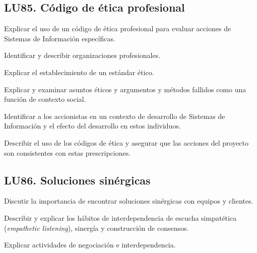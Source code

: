 \subsection{LU85. Código de ética profesional}\label{sec:BOK-LU85}\label{sec:LU85}
\begin{LearningUnit}
\begin{LUGoal}
\item Explicar el uso de un código de ética profesional para evaluar acciones de Sistemas de Información específicas.
\end{LUGoal}

\begin{LUObjective}
\item Identificar y describir organizaciones profesionales.
\item Explicar el establecimiento de un estándar ético.
\item Explicar y examinar asuntos éticos y argumentos y métodos fallidos como una función de contexto social.
\item Identificar a los accionistas en un contexto de desarrollo de Sistemas de Información y el efecto del desarrollo en estos individuos.
\item Describir el uso de los códigos de ética y asegurar que las acciones del proyecto son consistentes con estas prescripciones.
\end{LUObjective}
\end{LearningUnit}

\subsection{LU86. Soluciones sinérgicas}\label{sec:BOK-LU86}\label{sec:LU86}
\begin{LearningUnit}
\begin{LUGoal}
\item Discutir la importancia de encontrar soluciones sinérgicas con equipos y clientes.
\end{LUGoal}

\begin{LUObjective}
\item Describir y explicar los hábitos de interdependencia de escucha simpatética (\textit{empathetic listening}), sinergía y construcción de consensos.
\item Explicar actividades de negociación e interdependencia.
\end{LUObjective}
\end{LearningUnit}

